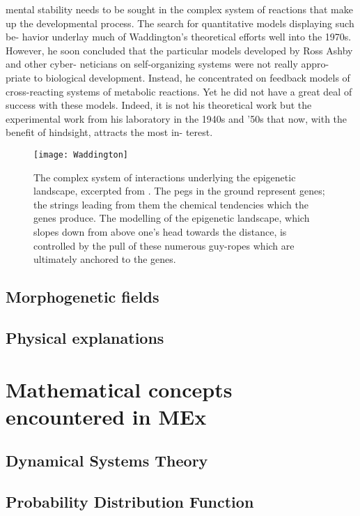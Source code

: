 \begin{longquote}
mental stability needs to be sought in the complex system
of reactions that make up the developmental process.
The search for quantitative models displaying such be-
havior underlay much of Waddington’s theoretical efforts
well into the 1970s. However, he soon concluded that the
particular models developed by Ross Ashby and other cyber-
neticians on self-organizing systems were not really appro-
priate to biological development. Instead, he concentrated
on feedback models of cross-reacting systems of metabolic
reactions. Yet he did not have a great deal of success with
these models. Indeed, it is not his theoretical work but the
experimental work from his laboratory in the 1940s and ’50s
that now, with the benefit of hindsight, attracts the most in-
terest.
\cite[p.117-119]{Keller2000}
\end{longquote}

\begin{figure}
\texttt{[image: Waddington]}
\centering
\caption{The complex system of interactions underlying the epigenetic landscape, excerpted from \cite{Waddington1957}.
The pegs in the ground represent genes; the strings leading from
them the chemical tendencies which the genes produce. The
modelling of the epigenetic landscape, which slopes down from
above one's head towards the distance, is controlled by the pull
of these numerous guy-ropes which are ultimately anchored to
the genes.}
\label{fig:Waddington}
\end{figure}


\subsection{Morphogenetic fields}
\subsection{Physical explanations}
\label{physex}


\section{Mathematical concepts encountered in MEx}
\subsection{Dynamical Systems Theory}
\subsection{Probability Distribution Function}
\label{PDF}
